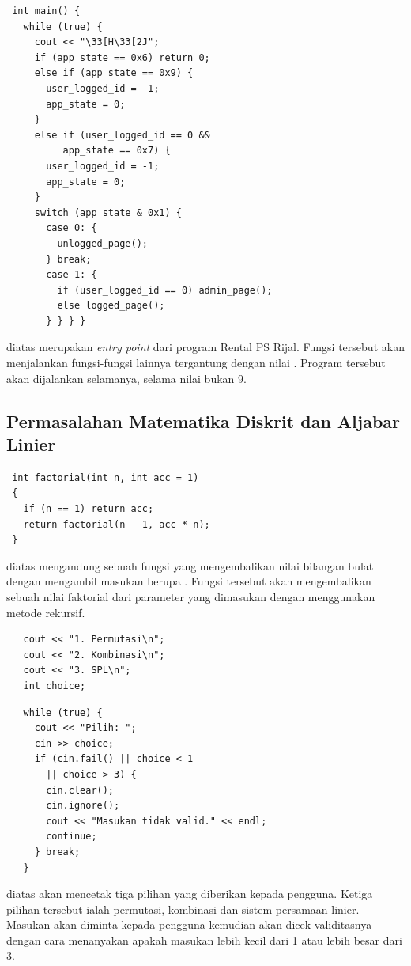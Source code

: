 \documentclass[../main.tex]{subfiles}
\begin{document}
\begin{lstlisting}
 int main() {
   while (true) {
     cout << "\33[H\33[2J";
     if (app_state == 0x6) return 0;
     else if (app_state == 0x9) {
       user_logged_id = -1;
       app_state = 0;
     }
     else if (user_logged_id == 0 &&
          app_state == 0x7) {
       user_logged_id = -1;
       app_state = 0;
     }
     switch (app_state & 0x1) {
       case 0: {
         unlogged_page();
       } break;
       case 1: {
         if (user_logged_id == 0) admin_page();
         else logged_page();
       } } } }
\end{lstlisting}
    \ilz{}{\Script} diatas merupakan \textit{entry point} dari program Rental PS Rijal. Fungsi tersebut akan menjalankan fungsi-fungsi lainnya tergantung dengan nilai . Program tersebut akan dijalankan selamanya, selama nilai  bukan 9.

    \subsection{Permasalahan Matematika Diskrit dan Aljabar Linier}

\begin{lstlisting}
 int factorial(int n, int acc = 1)
 {
   if (n == 1) return acc;
   return factorial(n - 1, acc * n);
 }
\end{lstlisting}
    \ilz{}{\Script} diatas mengandung sebuah fungsi yang mengembalikan nilai bilangan bulat dengan mengambil masukan berupa . Fungsi tersebut akan mengembalikan sebuah nilai faktorial dari parameter yang dimasukan dengan menggunakan metode rekursif.

\begin{lstlisting}
   cout << "1. Permutasi\n";
   cout << "2. Kombinasi\n";
   cout << "3. SPL\n";
   int choice;
\end{lstlisting}
\begin{lstlisting}
   while (true) {
     cout << "Pilih: ";
     cin >> choice;
     if (cin.fail() || choice < 1
       || choice > 3) {
       cin.clear();
       cin.ignore();
       cout << "Masukan tidak valid." << endl;
       continue;
     } break;
   }
\end{lstlisting}
    \ilz{}{\Script} diatas akan mencetak tiga pilihan yang diberikan kepada pengguna. Ketiga pilihan tersebut ialah permutasi, kombinasi dan sistem persamaan linier. Masukan akan diminta kepada pengguna kemudian akan dicek validitasnya dengan cara menanyakan apakah masukan lebih kecil dari 1 atau lebih besar dari 3.
\end{document}
